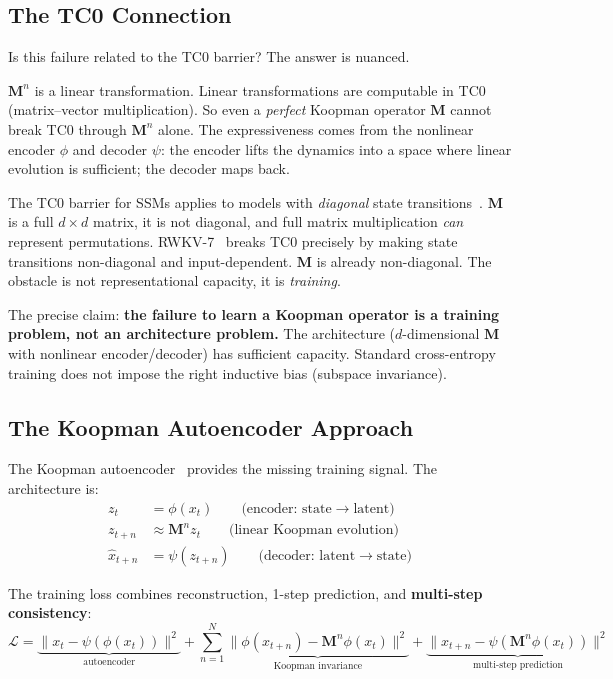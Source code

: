 \documentclass[11pt, a4paper]{article}
\newcommand{\M}{\mathbf{M}}
\theoremstyle{plain}
\theoremstyle{remark}
\begin{document}
\subsection{The TC0 Connection}

Is this failure related to the TC0 barrier?
The answer is nuanced.

$\M^n$ is a linear transformation.
Linear transformations are computable in TC0 (matrix--vector multiplication).
So even a \emph{perfect} Koopman operator $\M$ cannot break TC0 through $\M^n$ alone.
The expressiveness comes from the nonlinear encoder $\phi$ and decoder $\psi$: the encoder lifts the dynamics into a space where linear evolution is sufficient; the decoder maps back.

The TC0 barrier for SSMs applies to models with \emph{diagonal} state transitions~\cite{merrill2024illusion}.
$\M$ is a full $d \times d$ matrix, it is not diagonal, and full matrix multiplication \emph{can} represent permutations.
RWKV-7~\cite{peng2025rwkv7} breaks TC0 precisely by making state transitions non-diagonal and input-dependent.
$\M$ is already non-diagonal.
The obstacle is not representational capacity, it is \emph{training}.

The precise claim: \textbf{the failure to learn a Koopman operator is a training problem, not an architecture problem.}
The architecture ($d$-dimensional $\M$ with nonlinear encoder/decoder) has sufficient capacity.
Standard cross-entropy training does not impose the right inductive bias (subspace invariance).

\subsection{The Koopman Autoencoder Approach}

The Koopman autoencoder~\cite{koopman_deep, tckae2025} provides the missing training signal.
The architecture is:
\begin{align}
    z_t &= \phi(x_t) \qquad \text{(encoder: state} \to \text{latent)} \\
    z_{t+n} &\approx \M^n z_t \qquad \text{(linear Koopman evolution)} \\
    \hat{x}_{t+n} &= \psi(z_{t+n}) \qquad \text{(decoder: latent} \to \text{state)}
\end{align}

The training loss combines reconstruction, 1-step prediction, and \textbf{multi-step consistency}:
\begin{equation}
    \mathcal{L} = \underbrace{\|x_t - \psi(\phi(x_t))\|^2}_{\text{autoencoder}} + \sum_{n=1}^{N} \underbrace{\|\phi(x_{t+n}) - \M^n \phi(x_t)\|^2}_{\text{Koopman invariance}} + \underbrace{\|x_{t+n} - \psi(\M^n \phi(x_t))\|^2}_{\text{multi-step prediction}}
\end{equation}
\end{document}

